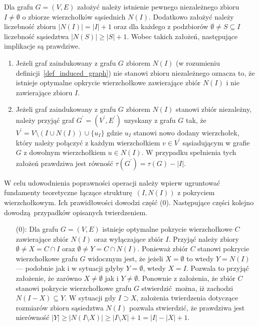 \par{
  \begin{theorem}
    Dla grafu $G=(V,E)$ założyć należy istnienie pewnego niezależnego zbioru $I\neq \emptyset$ o zbiorze wierzchołków sąsiednich $N(I)$.
    Dodatkowo założyć należy liczebność zbioru $|N(I)|=|I| + 1$ oraz dla każdego z podzbiorów $\emptyset \neq S \subseteq I$ liczebność sąsiedztwa $|N(S)| \geq |S| + 1$.
    Wobec takich założeń, następujące implikacje są prawdziwe.
    \begin{enumerate}
      \item Jeżeli graf zaindukowany z grafu $G$ zbiorem $N(I)$ (w rozumieniu definicji~\ref{def_induced_graph}) nie stanowi zbioru niezależnego oznacza to, że istnieje optymalne opkrycie wierzchołkowe zawierające zbiór $N(I)$ i nie zawierające zbioru $I$.
      \item Jeżeli graf zaindukowany z grafu $G$ zbiorem $N(I)$ stanowi zbiór niezależny, należy przyjąć graf $G^\prime=(V^\prime, E^\prime)$ uzyskany z grafu $G$ tak, że $V^\prime=V \setminus (I \cup N(I)) \cup \{u_I\}$ gdzie $u_I$ stanowi nowo dodany wierzchołek, który należy połączyć z każdym wierzchołkiem $v \in V^\prime$ sąsiadującym w grafie $G$ z dowolnym wierzchołkiem $u \in N(I)$.
      W przypadku spełnienia tych założeń prawdziwa jest równość $\tau(G^\prime)=\tau(G)-|I|$.
    \end{enumerate}
  \end{theorem}
  \begin{bproof} W celu udowodnienia poprawności operacji należy wpierw ugruntować fundamenty teoretyczne łączące strukturę $(I, N(I))$ z pokryciem wierzchołkowym. Ich prawidłowości dowodzi część (0).
    Następujące części kolejno dowodzą przypadków opisanych twierdzeniem.
    \begin{itemize}
      \item[(0):] Dla grafu $G=(V, E)$ istnieje optymalne pokrycie wierzchołkowe $C$ zawierające zbiór $N(I)$ oraz wyłączające zbiór $I$.
      Przyjąć należy zbiory $\emptyset \neq X=C \cap I$ oraz $\emptyset \neq Y=C \cap N(I)$.
      Ponieważ zbiór $C$ stanowi pokrycie wierzchołkowe grafu $G$ widocznym jest, że jeżeli $X=\emptyset$ to wtedy $Y=N(I)$ --- podobnie jak i w sytuacji gdyby $Y=\emptyset$, wtedy $X=I$.
      Pozwala to przyjąć założenie, że zarówno $X\neq \emptyset$ jak i $Y\neq \emptyset$.
      Ponownie z założenia, że zbiór $C$ stanowi pokrycie wierzchołkowe grafu $G$ stwierdzić można, iż zachodzi $N(I-X)\subseteq Y$.
      W sytuacji gdy $I \supset X$, założenia twierdzenia dotyczące rozmiarów zbioru sąsiedztwa $N(I)$ pozwala stwierdzić, że prawdziwa jest nierówność $|Y| \geq |N(I \setminus X)| \geq |I \setminus X| + 1 = |I| - |X| + 1$.

\end{itemize}
\end{bproof}}

